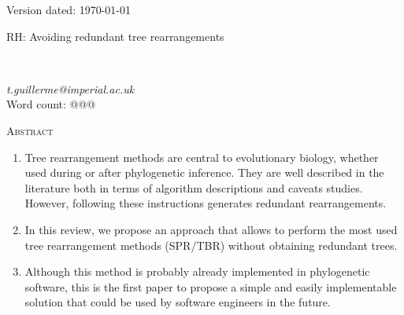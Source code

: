 \documentclass[12pt,letterpaper]{article}
\renewcommand{\section}[1]{%
\bigskip
\begin{center}
\begin{Large}
\normalfont\scshape #1
\medskip
\end{Large}
\end{center}}
\begin{document}

\begin{flushright}
Version dated: \today
\end{flushright}
\bigskip
\noindent RH: Avoiding redundant tree rearrangements

\bigskip
\medskip
\begin{center}

\bigskip

\\ %
\end{center}
\medskip
{} \textit{t.guillerme@imperial.ac.uk}\\  %
\medskip
Word count: @@@
\vspace{1in}

\modulolinenumbers[1]
\linenumbers

%
%

\newpage
\section{Abstract}
\begin{enumerate}
    \item Tree rearrangement methods are central to evolutionary biology, whether used during or after phylogenetic inference. They are well described in the literature both in terms of algorithm descriptions and caveats studies. However, following these instructions generates redundant rearrangements. %
    \item In this review, we propose an approach that allows to perform the most used tree rearrangement methods (SPR/TBR) without obtaining redundant trees.%
    \item Although this method is probably already implemented in phylogenetic software, this is the first paper to propose a simple and easily implementable solution that could be used by software engineers in the future. %
\end{enumerate}
\end{document}
